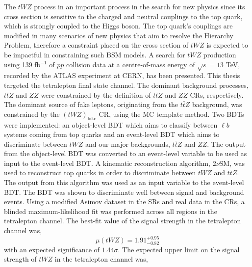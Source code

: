  

The $tWZ$ process in an important process in the search for new physics since its cross section is sensitive to the charged and neutral couplings to the top quark, which is strongly coupled to the Higgs boson. The top quark's couplings are modified in many scenarios of new physics that aim to resolve the Hierarchy Problem, therefore a constraint placed on the cross section of $tWZ$ is expected to be impactful in constraining such BSM models. A search for $tWZ$ production using 139 fb$^{-1}$ of $pp$ collision data at a centre-of-mass energy of $\sqrt{s} = 13$ TeV, recorded by the ATLAS experiment at CERN, has been presented. This thesis targeted the tetralepton final state channel. The dominant background processes, $t\bar{t}Z $ and $ZZ$ were constrained by the definition of $t\bar{t}Z$ and $ZZ$ CRs, respectively. The dominant source of fake leptons, originating from the $t\bar{t}Z$ background, was constrained by the $(tWZ)_{\text{fake}}$ CR, using the MC template method. Two BDTs were implemented: an object-level BDT which aims to classify between $\ell b$ systems coming from top quarks and an event-level BDT which aims to discriminate between $tWZ$ and our major backgrounds, $t\bar{t}Z$ and $ZZ$. The output from the object-level BDT was converted to an event-level variable to be used as input to the event-level BDT. A kinematic reconstruction algorithm, 2$\nu$SM, was used to reconstruct top quarks in order to discriminate between $tWZ$ and $t\bar{t}Z$. The output from this algorithm was used as an input variable to the event-level BDT. The BDT was shown to discriminate well between signal and background events. Using a modified Asimov dataset in the SRs and real data in the CRs, a blinded maximum-likelihood fit was performed across all regions in the tetralepton channel. The best-fit value of the signal strength in the tetralepton channel was,
\begin{equation}
  \mu (tWZ) =   1.91^{+0.95}_{-0.82}
\end{equation}
with an expected significance of $1.44\sigma$. The expected upper limit on the signal strength of $tWZ$ in the tetralepton channel was,

